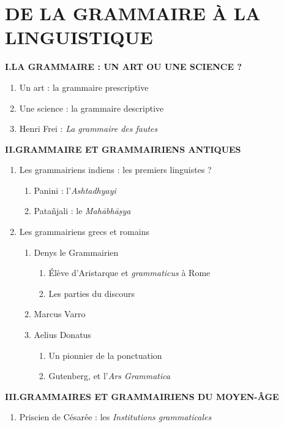 \chapter{DE LA GRAMMAIRE À LA LINGUISTIQUE}
\label{chapter-3}
\begin{keybox}
\small
\textbf{I.\quad LA GRAMMAIRE : UN ART OU UNE SCIENCE ?}
\begin{enumerate}[label=\arabic*.]
\item Un art : la grammaire prescriptive
\item Une science : la grammaire descriptive
\item Henri Frei : \textit{La grammaire des fautes}
\end{enumerate}
\textbf{II.\quad GRAMMAIRE ET GRAMMAIRIENS ANTIQUES}
\begin{enumerate}[label=\arabic*.]
\item Les grammairiens indiens : les premiers linguistes ?
\begin{enumerate}[label=\textcircled{\scriptsize\arabic*}]
\item Panini : l’\textit{Ashtadhyayi}
\item Patañjali : le \textit{Mahābhāṣya}
\end{enumerate}
\item Les grammairiens grecs et romains
\begin{enumerate}[label=\textcircled{\scriptsize\arabic*}]
\item Denys le Grammairien
\begin{enumerate}[label=\arabic*.]
\item Élève d’Aristarque et \textit{grammaticus} à Rome
\item Les parties du discours
\end{enumerate}
\item Marcus Varro
\item Aelius Donatus
\begin{enumerate}[label=\arabic*.]
\item Un pionnier de la ponctuation
\item Gutenberg, et l’\textit{Ars Grammatica}
\end{enumerate}
\end{enumerate}
\end{enumerate}
\textbf{III.\quad GRAMMAIRES ET GRAMMAIRIENS DU MOYEN-ÂGE}
\begin{enumerate}[label=\arabic*.]
\item Priscien de Césarée : les \textit{Institutions grammaticales}

\end{enumerate}
\end{keybox}
